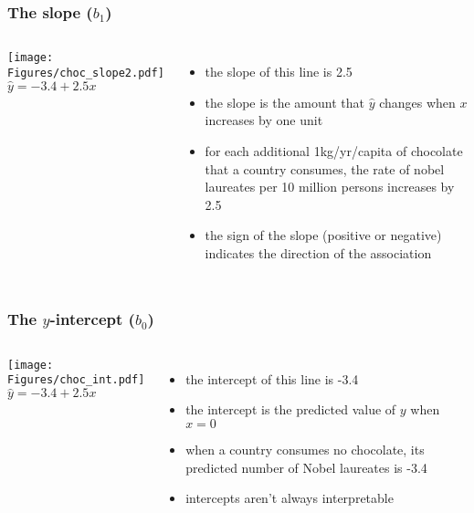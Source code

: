 \begin{frame}
\frametitle{The slope ($b_1$)}
\begin{columns}
\texttt{[image: Figures/choc\_slope2.pdf]}
$\displaystyle \hat{y}= -3.4 + 2.5x$
\begin{itemize}
    \item
    the slope of this line is 2.5
    \item
    the slope is the amount that $\hat{y}$ changes when $x$ increases by one unit
    \item
    for each additional 1kg/yr/capita of chocolate that a country consumes, the rate of nobel laureates per 10 million persons increases by 2.5
    \item
    the sign of the slope (positive or negative) indicates the direction of the association
\end{itemize}
\end{columns}
\end{frame}


\begin{frame}
\frametitle{The $y$-intercept ($b_0$)}
\begin{columns}
\texttt{[image: Figures/choc\_int.pdf]}\\
$\displaystyle \hat{y}= -3.4 + 2.5x$
\begin{itemize}
    \item
    the intercept of this line is -3.4
    \item
    the intercept is the predicted value of $y$ when $x=0$
    \item
    when a country consumes no chocolate, its predicted number of Nobel laureates is -3.4
    \item
    intercepts aren't always interpretable
\end{itemize}
\end{columns}
\end{frame}

